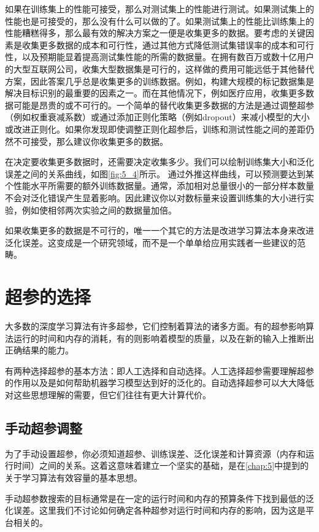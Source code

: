 如果在训练集上的性能可接受，那么对测试集上的性能进行测试。如果测试集上的性能也是可接受的，那么没有什么可以做的了。如果测试集上的性能比训练集上的性能糟糕得多，那么最有效的解决方案之一便是收集更多的数据。要考虑的关键因素是收集更多数据的成本和可行性，通过其他方式降低测试集错误率的成本和可行性，以及预期能显着提高测试集性能的所需的数据量。在拥有数百万或数十亿用户的大型互联网公司，收集大型数据集是可行的，这样做的费用可能远低于其他替代方案，因此答案几乎总是收集更多的训练数据。例如，构建大规模的标记数据集是解决目标识别的最重要的因素之一。而在其他情况下，例如医疗应用，收集更多数据可能是昂贵的或不可行的。一个简单的替代收集更多数据的方法是通过调整超参（例如权重衰减系数）或通过添加正则化策略（例如dropout）来减小模型的大小或改进正则化。如果你发现即使调整正则化超参后，训练和测试性能之间的差距仍然不可接受，那么建议你收集更多的数据。

在决定要收集更多数据时，还需要决定收集多少。我们可以绘制训练集大小和泛化误差之间的关系曲线，如图\ref{fig:5_4}所示。 通过外推这样曲线，可以预测要达到某个性能水平所需要的额外训练数据量。通常，添加相对总量很小的一部分样本数量不会对泛化错误产生显着影响。因此建议你以对数标量来设置训练集的大小进行实验，例如使相邻两次实验之间的数据量加倍。

如果收集更多的数据是不可行的，唯一一个其它的方法是改进学习算法本身来改进泛化误差。这变成是一个研究领域，而不是一个单单给应用实践者一些建议的范畴。

\section{超参的选择}
\label{sec:11.4}

大多数的深度学习算法有许多超参，它们控制着算法的诸多方面。有的超参影响算法运行的时间和内存的消耗，有的则影响着模型的质量，以及在新的输入上推断出正确结果的能力。

有两种选择超参的基本方法：即人工选择和自动选择。人工选择超参需要理解超参的作用以及是如何帮助机器学习模型达到好的泛化的。自动选择超参可以大大降低对这些思想理解的需要，但它们往往有更大计算代价。


\subsection{手动超参调整}
\label{sec:11.4.1}

为了手动设置超参，你必须知道超参、训练误差、泛化误差和计算资源（内存和运行时间）之间的关系。这着这意味着建立一个坚实的基础，是在\ref{chap:5}中提到的关于学习算法有效容量的基本思想。

手动超参数搜索的目标通常是在一定的运行时间和内存的预算条件下找到最低的泛化误差。这里我们不讨论如何确定各种超参对运行时间和内存的影响，因为这是平台相关的。

